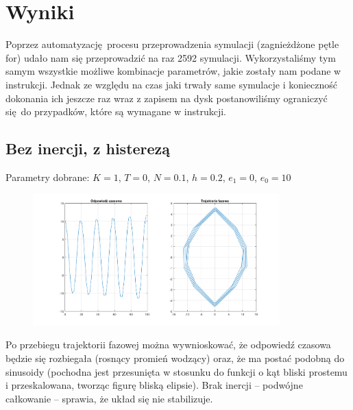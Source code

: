 \documentclass[a4paper, 12pt]{article}
\begin{document}
	\section{Wyniki}
		Poprzez automatyzację procesu przeprowadzenia symulacji (zagnieżdżone pętle for) udało nam się przeprowadzić na raz 2592 symulacji. Wykorzystaliśmy tym samym wszystkie możliwe kombinacje parametrów, jakie zostały nam podane w instrukcji. Jednak ze względu na czas jaki trwały same symulacje i konieczność dokonania ich jeszcze raz wraz z zapisem na dysk postanowiliśmy ograniczyć się do przypadków, które są wymagane w instrukcji.
		\subsection{Bez inercji, z histerezą}
			Parametry dobrane: $K = 1$, $T = 0$, $N = 0.1$, $h = 0.2$, $e_1 = 0$, $e_0 = 10$
			\begin{figure}[H]
				\centering
				\includegraphics[width = 0.85\textwidth]{./img/K_1_T_0_N_1_h_2_e1_0_e0_100.png}
			\end{figure} \noindent
			Po przebiegu trajektorii fazowej można wywnioskować, że odpowiedź czasowa będzie się rozbiegała (rosnący promień wodzący) oraz, że ma postać podobną do sinusoidy (pochodna jest przesunięta w stosunku do funkcji o kąt bliski prostemu i przeskalowana, tworząc figurę bliską elipsie). Brak inercji -- podwójne całkowanie -- sprawia, że układ się nie stabilizuje.
\end{document}
